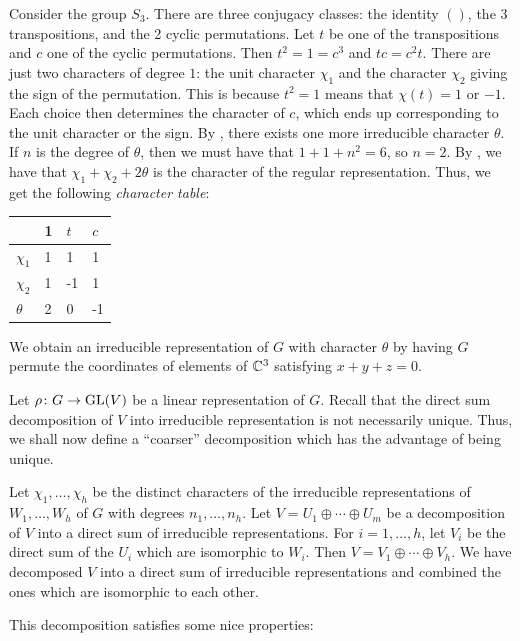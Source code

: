 \documentclass[letterpaper, 11pt, oneside]{book}
\begin{document}
\begin{ex}
  Consider the group $S_{3}$.
  There are three conjugacy classes: the identity $()$, the 3 transpositions, and the 2 cyclic permutations.
  Let $t$ be one of the transpositions and $c$ one of the cyclic permutations.
  Then $t^{2} = 1 = c^{3}$ and $tc = c^{2}t$.
  There are just two characters of degree $1$: the unit character $\chi_{1}$ and the character $\chi_{2}$ giving the sign of the permutation.
  This is because $t^{2} = 1$ means that $\chi(t) = 1$ or $-1$.
  Each choice then determines the character of $c$, which ends up corresponding to the unit character or the sign.
  By , there exists one more irreducible character $\theta$.
  If $n$ is the degree of $\theta$, then we must have that $1 + 1 + n^{2} = 6$, so $n = 2$.
  By , we have that $\chi_{1} + \chi_{2} + 2\theta$ is the character of the regular representation.
  Thus, we get the following \emph{character table}:

  \begin{center}
    \centering
    \begin{table}[h]
      \begin{tabular}{l|lll}
        & 1 & $t$ & $c$ \\ \hline
        $\chi_1$ & 1 & 1   & 1   \\
        $\chi_2$ & 1 & -1  & 1   \\
        $\theta$ & 2 & 0   & -1
      \end{tabular}
    \end{table}
  \end{center}

  We obtain an irreducible representation of $G$ with character $\theta$ by having $G$ permute the coordinates of elements of $\mathbb{C}^{3}$ satisfying $x + y + z = 0$.
\end{ex}

Let $\rho\colon G \to \operatorname{GL}(V)$ be a linear representation of $G$.
Recall that the direct sum decomposition of $V$ into irreducible representation is not necessarily unique.
Thus, we shall now define a ``coarser'' decomposition which has the advantage of being unique.

\begin{defn}
  Let $\chi_{1}, \ldots, \chi_{h}$ be the distinct characters of the irreducible representations of $W_{1}, \ldots, W_{h}$ of $G$ with degrees $n_{1}, \ldots, n_{h}$.
  Let $V = U_{1} \oplus \cdots \oplus U_{m}$ be a decomposition of $V$ into a direct sum of irreducible representations.
  For $i = 1, \ldots, h$, let $V_{i}$ be the direct sum of the $U_{i}$ which are isomorphic to $W_{i}$.
  Then $V = V_{1} \oplus \cdots \oplus V_{h}$.
  We have decomposed $V$ into a direct sum of irreducible representations and combined the ones which are isomorphic to each other.
\end{defn}
This decomposition satisfies some nice properties:
\end{document}
